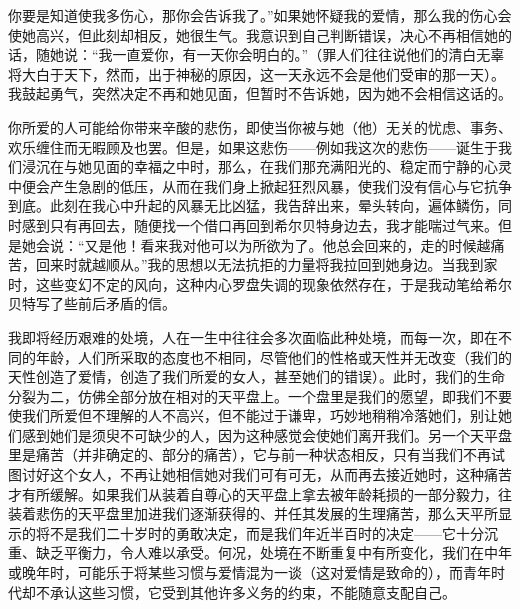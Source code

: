 你要是知道使我多伤心，那你会告诉我了。”如果她怀疑我的爱情，那么我的伤心会使她高兴，但此刻却相反，她很生气。我意识到自己判断错误，决心不再相信她的话，随她说：“我一直爱你，有一天你会明白的。”（罪人们往往说他们的清白无辜将大白于天下，然而，出于神秘的原因，这一天永远不会是他们受审的那一天）。我鼓起勇气，突然决定不再和她见面，但暂时不告诉她，因为她不会相信这话的。
\par 你所爱的人可能给你带来辛酸的悲伤，即使当你被与她（他）无关的忧虑、事务、欢乐缠住而无暇顾及也罢。但是，如果这悲伤——例如我这次的悲伤——诞生于我们浸沉在与她见面的幸福之中时，那么，在我们那充满阳光的、稳定而宁静的心灵中便会产生急剧的低压，从而在我们身上掀起狂烈风暴，使我们没有信心与它抗争到底。此刻在我心中升起的风暴无比凶猛，我告辞出来，晕头转向，遍体鳞伤，同时感到只有再回去，随便找一个借口再回到希尔贝特身边去，我才能喘过气来。但是她会说：“又是他！看来我对他可以为所欲为了。他总会回来的，走的时候越痛苦，回来时就越顺从。”我的思想以无法抗拒的力量将我拉回到她身边。当我到家时，这些变幻不定的风向，这种内心罗盘失调的现象依然存在，于是我动笔给希尔贝特写了些前后矛盾的信。
\par 我即将经历艰难的处境，人在一生中往往会多次面临此种处境，而每一次，即在不同的年龄，人们所采取的态度也不相同，尽管他们的性格或天性并无改变（我们的天性创造了爱情，创造了我们所爱的女人，甚至她们的错误）。此时，我们的生命分裂为二，仿佛全部分放在相对的天平盘上。一个盘里是我们的愿望，即我们不要使我们所爱但不理解的人不高兴，但不能过于谦卑，巧妙地稍稍冷落她们，别让她们感到她们是须臾不可缺少的人，因为这种感觉会使她们离开我们。另一个天平盘里是痛苦（并非确定的、部分的痛苦），它与前一种状态相反，只有当我们不再试图讨好这个女人，不再让她相信她对我们可有可无，从而再去接近她时，这种痛苦才有所缓解。如果我们从装着自尊心的天平盘上拿去被年龄耗损的一部分毅力，往装着悲伤的天平盘里加进我们逐渐获得的、并任其发展的生理痛苦，那么天平所显示的将不是我们二十岁时的勇敢决定，而是我们年近半百时的决定——它十分沉重、缺乏平衡力，令人难以承受。何况，处境在不断重复中有所变化，我们在中年或晚年时，可能乐于将某些习惯与爱情混为一谈（这对爱情是致命的），而青年时代却不承认这些习惯，它受到其他许多义务的约束，不能随意支配自己。

